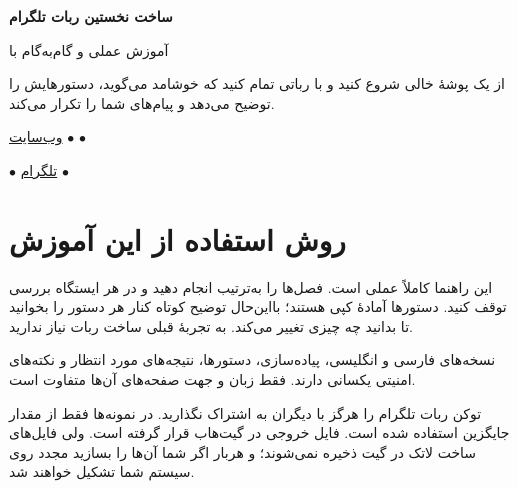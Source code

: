 \documentclass[11pt,openany]{book}
\begin{document}
\begin{titlepage}
\pagecolor{Primary}\color{white}\centering
\vspace*{2.2cm}
{\Huge\bfseries ساخت نخستین ربات تلگرام\par}
\vspace{0.5cm}
{\LARGE آموزش عملی و گام‌به‌گام با
\par}
\vspace{1.5cm}
\begin{tcolorbox}[width=.82\textwidth,colback=Primary!72!black,colframe=white]
\centering\color{white}\large
از یک پوشهٔ خالی شروع کنید و با رباتی تمام کنید که خوشامد می‌گوید،
دستورهایش را توضیح می‌دهد و پیام‌های شما را تکرار می‌کند.
\end{tcolorbox}
\vfill
{\Large\bfseries{}\par}
\vspace{0.35cm}
\hypersetup{urlcolor=white}
\href{https://alirezaaies.github.io/}{وب‌سایت} $\bullet$
\href{https://github.com/alirezaaies}{} $\bullet$
\href{https://www.linkedin.com/in/alirezakhajehvandi}{}\par
\href{https://www.youtube.com/@AlirezaAIES}{} $\bullet$
\href{https://t.me/AlirezaAIES}{تلگرام} $\bullet$
\href{https://www.instagram.com/alireza.aies}{}
\hypersetup{urlcolor=Primary}
\vspace*{1.4cm}
\end{titlepage}
\nopagecolor\color{Ink}

\frontmatter
\chapter*{روش استفاده از این آموزش}
این راهنما کاملاً عملی است. فصل‌ها را به‌ترتیب انجام دهید و در هر ایستگاه
بررسی توقف کنید. دستورها آمادهٔ کپی هستند؛ بااین‌حال توضیح کوتاه کنار هر دستور
را بخوانید تا بدانید چه چیزی تغییر می‌کند. به تجربهٔ قبلی ساخت ربات نیاز ندارید.

نسخه‌های فارسی و انگلیسی، پیاده‌سازی، دستورها، نتیجه‌های مورد انتظار و نکته‌های
امنیتی یکسانی دارند. فقط زبان و جهت صفحه‌های آن‌ها متفاوت است.

\begin{warningbox}
توکن ربات تلگرام را هرگز با دیگران به اشتراک نگذارید. در نمونه‌ها فقط از مقدار
جایگزین استفاده شده است. فایل خروجی 
در گیت‌هاب قرار گرفته است. ولی فایل‌های ساخت لاتک در گیت ذخیره نمی‌شوند؛ و هربار اگر شما آن‌ها را بسازید مجدد روی سیستم شما تشکیل خواهند شد.
\end{warningbox}
\tableofcontents
\end{document}
